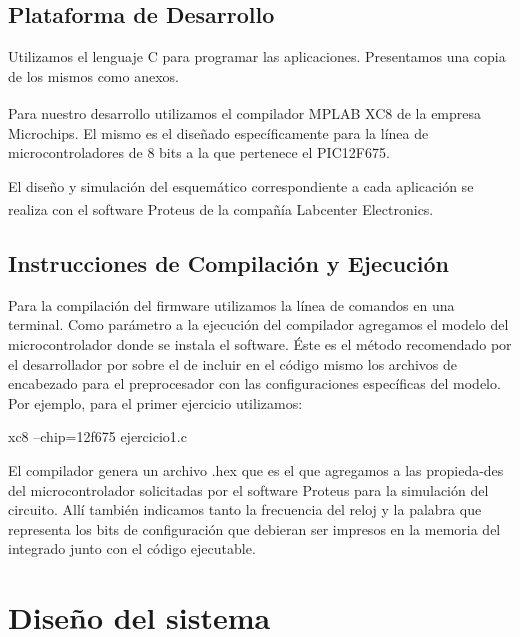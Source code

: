 \documentclass[a4paper]{article}
\let\originalcite\cite
\renewcommand{\cite}[2][]{\textsuperscript{\originalcite{#2}}}
\begin{document}
\subsection{Plataforma de Desarrollo}

Utilizamos el lenguaje C para programar las aplicaciones. Presentamos
una copia de los mismos como anexos.

Para nuestro desarrollo utilizamos el compilador MPLAB 
XC8\cite{bib:compilador} de la empresa Microchips. El mismo es el 
diseñado específicamente para la línea de microcontroladores de 8 bits
a la que pertenece el PIC12F675.

El diseño y simulación del esquemático correspondiente a cada 
aplicación se realiza con el software Proteus\cite{bib:simulador} de 
la compañía Labcenter Electronics.

\subsection{Instrucciones de Compilación y Ejecución}

Para la compilación del firmware utilizamos la línea de comandos en 
una terminal. Como parámetro a la ejecución del compilador agregamos
el modelo del microcontrolador donde se instala el software. Éste es 
el método recomendado por el desarrollador por sobre el de incluir en 
el código mismo los archivos de encabezado para el preprocesador con 
las configuraciones específicas del modelo. Por ejemplo, para el 
primer ejercicio utilizamos:

\begin{center}\ttfamily 
	xc8 --chip=12f675 ejercicio1.c
\end{center}

El compilador genera un archivo {\ttfamily .hex} que es el que
agregamos a las propieda-des del microcontrolador solicitadas 
por el software Proteus para la simulación del circuito. Allí también 
indicamos tanto la frecuencia del reloj y la palabra que representa 
los bits de configuración que debieran ser impresos en la memoria del
integrado junto con el código ejecutable. 

\section{Diseño del sistema}
\end{document}
